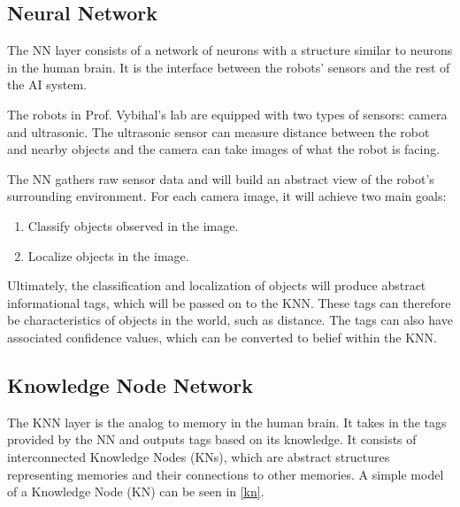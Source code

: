 \documentclass[titlepage,11pt]{article}
\newcommand{\ar}[1]{\autoref{#1}}
\begin{document}
\subsection{Neural Network}

The NN layer consists of a network of neurons with a structure similar to neurons in the human brain. It is the interface between the robots' sensors and the rest of the AI system.

The robots in Prof. Vybihal's lab are equipped with two types of sensors: camera and ultrasonic. The ultrasonic sensor can measure distance between the robot and nearby objects and the camera can take images of what the robot is facing.

The NN gathers raw sensor data and will build an abstract view of the robot's surrounding environment. For each camera image, it will achieve two main goals:

\begin{enumerate}
	\item Classify objects observed in the image.
	\item Localize objects in the image.
\end{enumerate}

Ultimately, the classification and localization of objects will produce abstract informational tags, which will be passed on to the KNN. These tags can therefore be characteristics of objects in the world, such as distance. The tags can also have associated confidence values, which can be converted to belief within the KNN.

\subsection{Knowledge Node Network} \label{sec:background_knn}

The KNN layer is the analog to memory in the human brain. It takes in the tags provided by the NN and outputs tags based on its knowledge. It consists of interconnected Knowledge Nodes (KNs), which are abstract structures representing memories and their connections to other memories. A simple model of a Knowledge Node (KN) can be seen in \ar{kn}.
\end{document}
